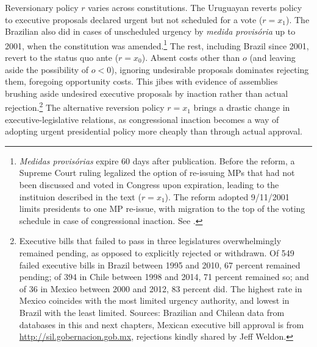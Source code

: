 \documentclass[letter,12pt]{article}
\newcommand{\mc}{\multicolumn}
\begin{document}

Reversionary policy $r$ varies across constitutions. The Uruguayan reverts policy to executive proposals declared urgent but not scheduled for a vote ($r=x_1$). The Brazilian also did in cases of unscheduled urgency by \emph{medida provis\'oria} up to 2001, when the constitution was amended.\footnote{\emph{Medidas provis\'orias} expire 60 days after publication. Before the reform, a Supreme Court ruling legalized the option of re-issuing MPs that had not been discussed and voted in Congress upon expiration, leading to the instituion described in the text ($r=x_1$). The reform adopted 9/11/2001 limits presidents to one MP re-issue, with migration to the top of the voting schedule in case of congressional inaction. See \citet{figueiredo.etal.1996}.} The rest, including Brazil since 2001, revert to the status quo ante ($r=x_0$). Absent costs other than $o$ (and leaving aside the possibility of $o<0$), ignoring undesirable proposals dominates rejecting them, foregoing opportunity costs. This jibes with evidence of assemblies brushing aside undesired executive proposals by inaction rather than actual rejection.\footnote{Executive bills that failed to pass in three legislatures overwhelmingly remained pending, as opposed to explicitly rejected or withdrawn. Of 549 failed executive bills in Brazil between 1995 and 2010, 67 percent remained pending; of 394 in Chile between 1998 and 2014, 71 percent remained so; and of 36 in Mexico between 2000 and 2012, 83 percent did. The highest rate in Mexico coincides with the most limited urgency authority, and lowest in Brazil with the least limited. Sources: Brazilian and Chilean data from databases in this and next chapters, Mexican executive bill approval is from \protect\url{http://sil.gobernacion.gob.mx}, rejections kindly shared by Jeff Weldon.} The alternative reversion policy $r=x_1$ brings a drastic change in executive-legislative relations, as congressional inaction becomes a way of adopting urgent presidential policy more cheaply than through actual approval.
\end{document}
